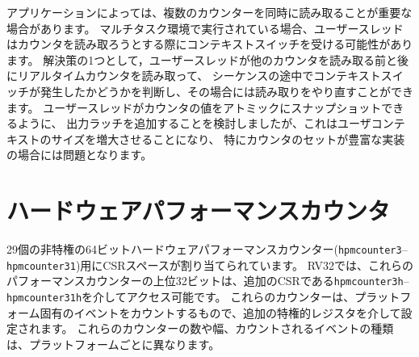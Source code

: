 \begin{commentary}
アプリケーションによっては、複数のカウンターを同時に読み取ることが重要な場合があります。
マルチタスク環境で実行されている場合、ユーザースレッドはカウンタを読み取ろうとする際にコンテキストスイッチを受ける可能性があります。 
解決策の1つとして，ユーザースレッドが他のカウンタを読み取る前と後にリアルタイムカウンタを読み取って、
シーケンスの途中でコンテキストスイッチが発生したかどうかを判断し、その場合には読み取りをやり直すことができます。 
ユーザースレッドがカウンタの値をアトミックにスナップショットできるように、
出力ラッチを追加することを検討しましたが、これはユーザコンテキストのサイズを増大させることになり、
特にカウンタのセットが豊富な実装の場合には問題となります。
\end{commentary}

\begin{comment}
\section{Hardware Performance Counters}
\end{comment}
\section{ハードウェアパフォーマンスカウンタ}

\begin{comment}
There is CSR space allocated for 29 additional unprivileged 64-bit
hardware performance counters, {\tt hpmcounter3}--{\tt hpmcounter31}.
For RV32, the upper 32 bits of these performance counters is
accessible via additional CSRs {\tt hpmcounter3h}--{\tt
  hpmcounter31h}.  These counters count platform-specific events and
are configured via additional privileged registers.  The number and
width of these additional counters, and the set of events they count
is platform-specific.
\end{comment}

29個の非特権の64ビットハードウェアパフォーマンスカウンター({\tt hpmcounter3}--{\tt hpmcounter31})用にCSRスペースが割り当てられています。
RV32では、これらのパフォーマンスカウンターの上位32ビットは、追加のCSRである{\tt hpmcounter3h}--{\tt hpmcounter31h}を介してアクセス可能です。
これらのカウンターは、プラットフォーム固有のイベントをカウントするもので、追加の特権的レジスタを介して設定されます。
これらのカウンターの数や幅、カウントされるイベントの種類は、プラットフォームごとに異なります。

